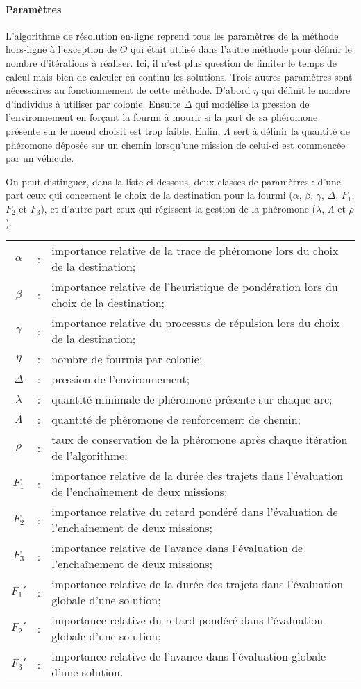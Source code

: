 \paragraph{Paramètres}

L'algorithme de résolution en-ligne reprend tous les paramètres de la méthode hors-ligne à l'exception de $\Theta$ qui était utilisé dans l'autre méthode pour définir le nombre d'itérations à réaliser. Ici, il n'est plus question de limiter le temps de calcul mais bien de calculer en continu les solutions. Trois autres paramètres sont nécessaires au fonctionnement de cette méthode. D'abord $\eta$ qui définit le nombre d'individus à utiliser par colonie. Ensuite $\Delta$ qui modélise la pression de l'environnement en forçant la fourmi à mourir si la part de sa phéromone présente sur le noeud choisit est trop faible. Enfin, $\Lambda$ sert à définir la quantité de phéromone déposée sur un chemin lorsqu'une mission de celui-ci est commencée par un véhicule.

On peut distinguer, dans la liste ci-dessous, deux classes de paramètres : d'une part ceux qui concernent le choix de la destination pour la fourmi ($\alpha$, $\beta$, $\gamma$, $\Delta$, $F_1$, $F_2$ et $F_3$), et d'autre part ceux qui régissent la gestion de la phéromone ($\lambda$, $\Lambda$ et $\rho$).\\

\begin{tabular}{ccp{}}
 $\alpha$ &:& importance relative de la trace de phéromone lors du choix de la destination;\\
 $\beta$ &:& importance relative de l'heuristique de pondération lors du choix de la destination;\\
 $\gamma$ &:& importance relative du processus de répulsion lors du choix de la destination;\\
 $\eta$ &:& nombre de fourmis par colonie;\\
 $\Delta$ &:& pression de l'environnement;\\
 $\lambda$ &:& quantité minimale de phéromone présente sur chaque arc;\\
 $\Lambda$ &:& quantité de phéromone de renforcement de chemin;\\
 $\rho$ &:& taux de conservation de la phéromone après chaque itération de l'algorithme;\\
 $F_1$ &:& importance relative de la durée des trajets dans l'évaluation de l'enchaînement de deux missions;\\
 $F_2$ &:& importance relative du retard pondéré dans l'évaluation de l'enchaînement de deux missions;\\
 $F_3$ &:& importance relative de l'avance dans l'évaluation de l'enchaînement de deux missions;\\
 $F_1'$ &:& importance relative de la durée des trajets dans l'évaluation globale d'une solution;\\
 $F_2'$ &:& importance relative du retard pondéré dans l'évaluation globale d'une solution;\\
 $F_3'$ &:& importance relative de l'avance dans l'évaluation globale d'une solution.
\end{tabular}
